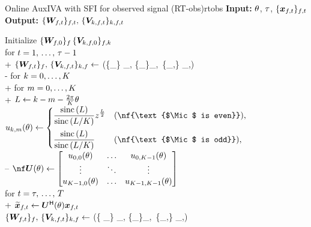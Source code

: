 \documentclass[sip,biber]{now-journal}
\begin{document}
\begin{algorithm}{Online AuxIVA with SFI for observed signal (RT-obs)}{rtobs}
  \textbf{Input:} $\theta$, $\tau$, $\{\Obs _{\ft}\} _{\ft}$ \\
  \textbf{Output:} $\{\Demix _{\ft}\}_{\ft},\, \{\cov _{\src,\ft}\}_{\src,\ft}$
  \begin{pseudo}
    Initialize $\{\bm{W} _{f,0}\} _{f} \, \{\bm{V} _{k,f,0}\} _{f,k}$ \\
    for $t = 1,\, \dots,\, \tau - 1$ \\+
      $\{\Demix _{\ft}\}_{\freq},\, \{\cov _{\src,\ft}\} _{\src,\freq} \gets$ (\{\Obs _{\ft}\} _{\freq}, \{\Demix _{\ft[-1]}\}_{\freq},\, \{\cov _{\src,\ft[-1]}\} _{\src,\freq}) \\-
    for $k = 0, \dots, K$ \\+
      for $m = 0, \dots, K$ \\+
        $L \gets k - m - \frac{2\pi}{K} \theta$ \\
        $\rotmat _{\src,\mic}(\rotSpat) \gets
          \begin{cases}
            \displaystyle \frac{\sinc{(\rotIdx)}}{\sinc{\left(\rotIdx / \Mic\right)}} \twid ^{\frac{\rotIdx}{2}} & (\nf{\text{$\Mic$ is even}}),\\[1em]
            \displaystyle \frac{\sinc{(\rotIdx)}}{\sinc{\left(\rotIdx / \Mic\right)}} & (\nf{\text{$\Mic$ is odd}}),
          \end{cases}
        $ \ct{\eqref{eq:rot:sinc}} \\--
    $\nf\rotMat (\rotSpat) \gets
      \begin{bmatrix}
        \rotmat _{0, 0}(\rotSpat) & \dots & \rotmat _{0, \Mic - 1}(\rotSpat) \\
        \vdots & \ddots & \vdots \\
        \rotmat _{\Mic - 1, 0}(\rotSpat) & \dots & \rotmat _{\Mic - 1, \Mic - 1}(\rotSpat)
      \end{bmatrix}
      $ \ct{\eqref{eq:rotmat}} \\
    for $t = \tau,\, \dots,\, T$ \\+
      $\refpos{\Obs} _{\ft} \gets \rotMat ^{\hermite} (\rotSpat) \Obs _{\ft}$ \ct{$(\forall \freq)$} \\
      $\{\Demix _{\ft}\}_{\freq},\, \{\cov _{\src,\ft}\} _{\src,\freq} \gets$ (\{ _{\ft}\} _{\freq}, \{\Demix _{\ft[-1]}\}_{\freq},\, \{\cov _{\src,\ft[-1]}\} _{\src,\freq})
  \end{pseudo}
\end{algorithm}
\end{document}
